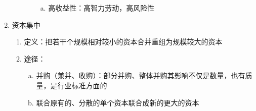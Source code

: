 \documentclass[12pt]{book}
\begin{document}
\begin{enumerate}[1.]
\begin{enumerate}[(1)]
\begin{enumerate}[a.]
\begin{enumerate}[(a)]
                                  \item 高收益性：高智力劳动，高风险性
                              \end{enumerate}
                    \end{enumerate}
          \end{enumerate}
    \item 资本集中
          \begin{enumerate}[(1)]
              \item 定义：把若干个规模相对较小的资本合并重组为规模较大的资本
              \item 途径：
                    \begin{enumerate}[a.]
                        \item 并购（兼并、收购）：部分并购、整体并购其影响不仅是数量，也有质量，是行业标准方面的
                        \item 联合原有的、分散的单个资本联合成新的更大的资本

\end{enumerate}
\end{enumerate}
\end{enumerate}
\end{document}
